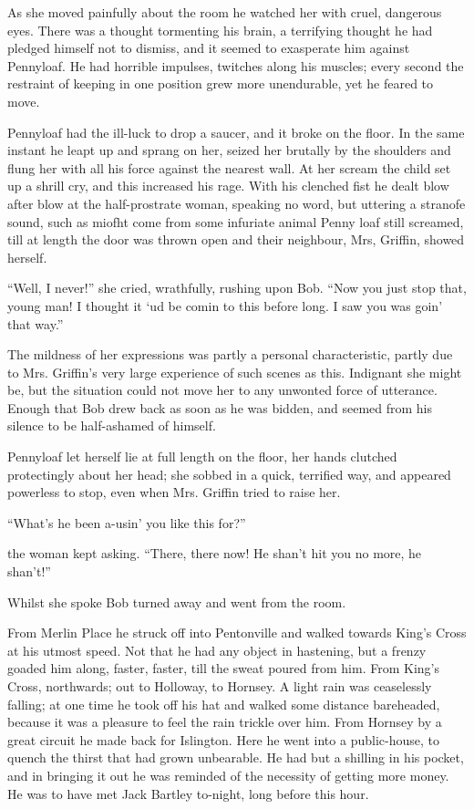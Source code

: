 As she moved painfully about the room he watched her with cruel,
dangerous eyes. There was a thought tormenting his brain, a terrifying
thought he had pledged himself not to dismiss, and it seemed to
exasperate him against Pennyloaf. He had horrible impulses, twitches
along his muscles; every second the restraint of keeping in one position
grew more unendurable, yet he feared to move.

Pennyloaf had the ill-luck to drop a saucer, and it broke on the floor.
In the same instant he leapt up and sprang on her, seized her brutally
by the shoulders and flung her with all his force against the nearest
wall. At her {}scream the child set up a shrill cry, and this increased
his rage. With his clenched fist he dealt blow after blow at the
half-prostrate woman, speaking no word, but uttering a stranofe sound,
such as miofht come from some infuriate animal Penny loaf still
screamed, till at length the door was thrown open and their neighbour,
Mrs, Griffin, showed herself.

``Well, I never!'' she cried, wrathfully, rushing upon Bob. ``Now you
just stop that, young man! I thought it `ud be comin to this before
long. I saw you was goin' that way.''

The mildness of her expressions was partly a personal characteristic,
partly due to Mrs. Griffin's very large experience of such scenes as
this. Indignant she might be, but the situation could not move her to
any unwonted force of utterance. Enough that Bob drew back as soon as he
was bidden, and seemed from his silence to be half-ashamed of himself.

Pennyloaf let herself lie at full length on the floor, her hands
clutched protectingly about her head; she sobbed in a quick, terrified
way, and appeared powerless to stop, even when Mrs. Griffin tried to
raise her.

``What's he been a-usin' you like this for?''

{}the woman kept asking. ``There, there now! He shan't hit you no more,
he shan't!''

Whilst she spoke Bob turned away and went from the room.

From Merlin Place he struck off into Pentonville and walked towards
King's Cross at his utmost speed. Not that he had any object in
hastening, but a frenzy goaded him along, faster, faster, till the sweat
poured from him. From King's Cross, northwards; out to Holloway, to
Hornsey. A light rain was ceaselessly falling; at one time he took off
his hat and walked some distance bareheaded, because it was a pleasure
to feel the rain trickle over him. From Hornsey by a great circuit he
made back for Islington. Here he went into a public-house, to quench the
thirst that had grown unbearable. He had but a shilling in his pocket,
and in bringing it out he was reminded of the necessity of getting more
money. He was to have met Jack Bartley to-night, long before this hour.

